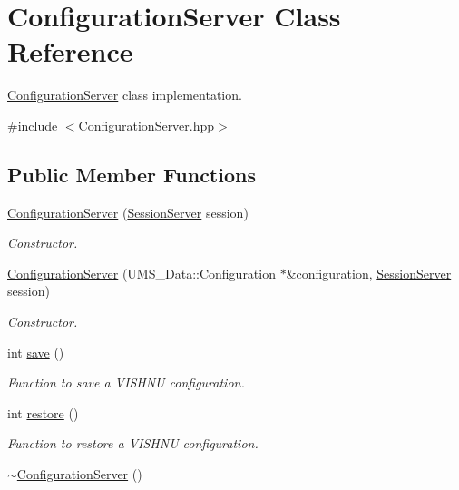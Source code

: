 \hypertarget{classConfigurationServer}{
\section{ConfigurationServer Class Reference}
\label{classConfigurationServer}
}


\hyperlink{classConfigurationServer}{ConfigurationServer} class implementation.  




{\ttfamily \#include $<$ConfigurationServer.hpp$>$}

\subsection*{Public Member Functions}
\begin{DoxyCompactItemize}
\item 
\hyperlink{classConfigurationServer_a56576161624c4cb62b332079efc733b9}{ConfigurationServer} (\hyperlink{classSessionServer}{SessionServer} session)
\begin{DoxyCompactList}\small\item\em Constructor. \item\end{DoxyCompactList}\item 
\hyperlink{classConfigurationServer_a0d37dc5d1d5a5e865f2a28b83fa60840}{ConfigurationServer} (UMS\_\-Data::Configuration $\ast$\&configuration, \hyperlink{classSessionServer}{SessionServer} session)
\begin{DoxyCompactList}\small\item\em Constructor. \item\end{DoxyCompactList}\item 
int \hyperlink{classConfigurationServer_a7d414b228146e93359137729e0dc7c08}{save} ()
\begin{DoxyCompactList}\small\item\em Function to save a VISHNU configuration. \item\end{DoxyCompactList}\item 
int \hyperlink{classConfigurationServer_afc429d2da8da6523dd5e61ee91fc087c}{restore} ()
\begin{DoxyCompactList}\small\item\em Function to restore a VISHNU configuration. \item\end{DoxyCompactList}\item 
\hypertarget{classConfigurationServer_af1c4ad2e0b6be6c2d44beaffe0eb9ec8}{
\hyperlink{classConfigurationServer_af1c4ad2e0b6be6c2d44beaffe0eb9ec8}{$\sim$ConfigurationServer} ()}
\label{classConfigurationServer_af1c4ad2e0b6be6c2d44beaffe0eb9ec8}


\end{DoxyCompactItemize}
